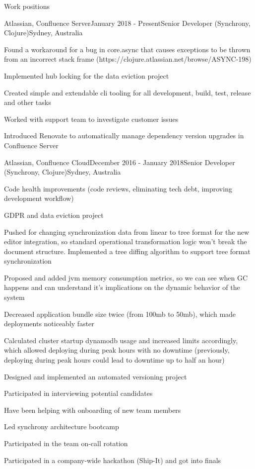 \documentclass{resume} %
\begin{document}
\begin{rSection}{Work positions}
\begin{rSubsection}{Atlassian, Confluence Server}{January 2018 - Present}{Senior Developer (Synchrony, Clojure)}{Sydney, Australia}
\item Found a workaround for a bug in core.async that causes exceptions to be thrown from an incorrect stack frame (https://clojure.atlassian.net/browse/ASYNC-198)
\item Implemented hub locking for the data eviction project
\item Created simple and extendable cli tooling for all development, build, test, release and other tasks
\item Worked with support team to investigate customer issues
\item Introduced Renovate to automatically manage dependency version upgrades in Confluence Server
~
\end{rSubsection}

\begin{rSubsection}{Atlassian, Confluence Cloud}{December 2016 - January 2018}{Senior Developer (Synchrony, Clojure)}{Sydney, Australia}

\item Code health improvements (code reviews, eliminating tech debt, improving development workflow)
\item GDPR and data eviction project
\item Pushed for changing synchronization data from linear to tree format for the new editor integration, so standard operational transformation logic won't break the document structure. Implemented a tree diffing algorithm to support tree format synchronization
\item Proposed and added jvm memory consumption metrics, so we can see when GC happens and can understand it's implications on the dynamic behavior of the system
\item Decreased application bundle size twice (from 100mb to 50mb), which made deployments noticeably faster
\item Calculated cluster startup dynamodb usage and increased limits accordingly, which allowed deploying during peak hours with no downtime (previously, deploying during peak hours could lead to downtime up to half an hour)
\item Designed and implemented an automated versioning project
\item Participated in interviewing potential candidates
\item Have been helping with onboarding of new team members
\item Led synchrony architecture bootcamp
\item Participated in the team on-call rotation
\item Participated in a company-wide hackathon (Ship-It) and got into finals
~
\end{rSubsection}


\end{rSection}
\end{document}
